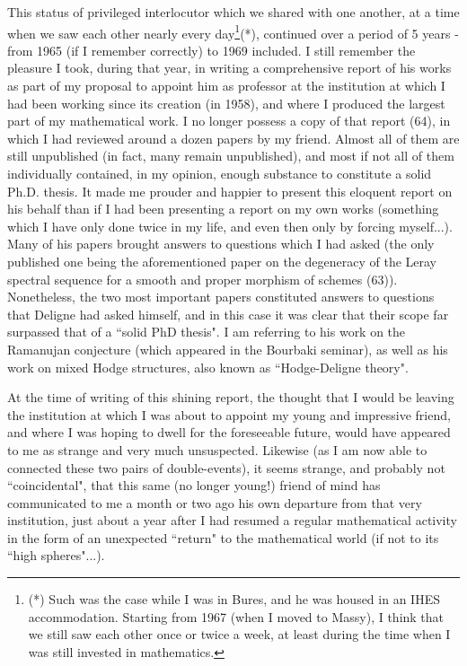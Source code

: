 This status of privileged interlocutor which we shared with one another,
at a time when we saw each other nearly every day\footnote{(*) Such was the case while I was in Bures, and he was housed in an IHES accommodation. Starting from 1967 (when I moved to Massy), I think that we still saw each other once or twice a week, at least during the time when I was still invested in mathematics.}(*),
continued over a period of 5 years - from 1965 (if I remember correctly) to 1969 included.
I still remember the pleasure I took, during that year, in writing a comprehensive report
of his works as part of my proposal to appoint him as professor at the
institution at which I had been working since its creation (in 1958), and where I produced
the largest part of my mathematical work.
I no longer possess a copy of that report (64), in which I had reviewed around a dozen
papers by my friend. Almost all of them are still unpublished (in fact, many remain
unpublished),
and most if not all of them individually contained, in my opinion, enough substance to
constitute a solid Ph.D. thesis. It made me prouder and happier to present this eloquent report on his behalf than if I had been presenting a report on my own works (something which I have only done twice in my life, and even then only by forcing myself...). Many of his papers brought answers to questions which I had asked (the only published one being the aforementioned paper on the degeneracy of the Leray spectral sequence for a smooth and proper morphism of schemes (63)). Nonetheless, the two most important papers constituted answers to questions that Deligne had asked himself, and in this case it was clear that their scope far surpassed that of a ``solid PhD thesis". I am referring to his work on the Ramanujan conjecture (which appeared in the Bourbaki seminar), as well as his work on mixed Hodge structures, also known as ``Hodge-Deligne theory".


At the time of writing of this shining report, the thought that I would be leaving the institution at which I was about to appoint my young and impressive friend, and where I was hoping to dwell for the foreseeable future, would have appeared to me as strange and very much unsuspected.  Likewise (as I am now able to connected these two pairs of double-events), it seems strange, and probably not ``coincidental", that this same (no longer young!) friend of mind has communicated to me a month or two ago his own departure from that very institution, just about a year after I had resumed a regular mathematical activity in the form of an unexpected ``return" to the mathematical world (if not to its ``high spheres"...).

